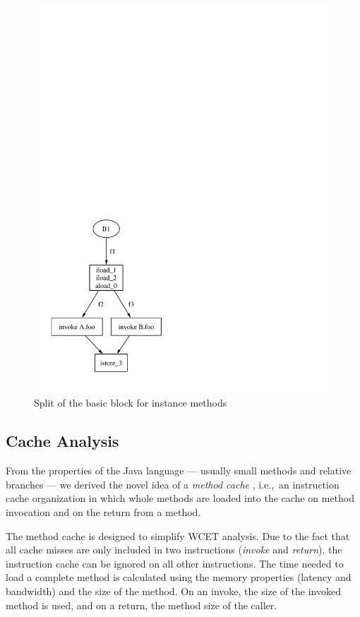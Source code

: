 \begin{figure}
    \centering
    \includegraphics[scale=0.5]{wcet/dispatch_split}
    \caption{Split of the basic block for instance methods}
    \label{fig:dispatch:split}
\end{figure}



\subsection{Cache Analysis} \label{sec:wcet:cache}

From the properties of the Java language
--- usually small methods and relative branches --- we derived the
novel idea of a \emph{method cache} \cite{jop:jtres_cache}, i.e.,\ an
instruction cache organization in which whole methods are loaded into
the cache on method invocation and on the return from a method.

The method cache is designed to simplify WCET analysis. Due to the
fact that all cache misses are only included in two instructions
(\emph{invoke} and \emph{return}), the instruction cache can be
ignored on all other instructions. The time needed to load a complete
method is calculated using the memory properties (latency and
bandwidth) and the size of the method. On an invoke, the size of the
invoked method is used, and on a return, the method size of the
caller.

